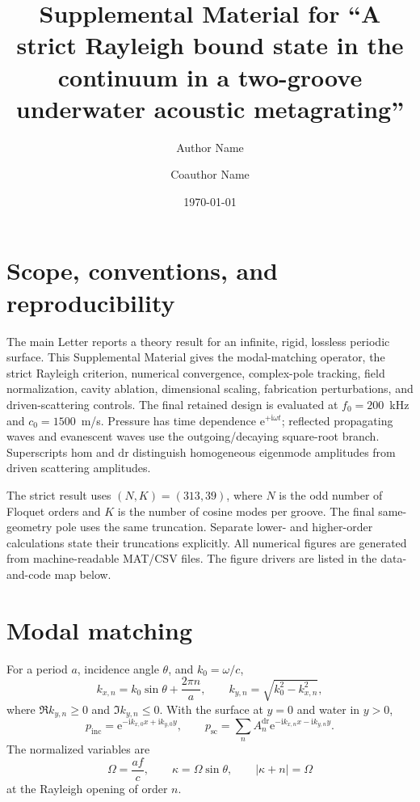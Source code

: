 \documentclass[aps,prl,reprint,superscriptaddress,nofootinbib,floatfix]{revtex4-2}
\newcommand{\ii}{\mathrm{i}}
\newcommand{\e}{\mathrm{e}}
\providecommand{\hom}{\mathrm{hom}}
\providecommand{\dr}{\mathrm{dr}}
\begin{document}
\title{Supplemental Material for ``A strict Rayleigh bound state in the continuum in a two-groove underwater acoustic metagrating''}
\author{Author Name}
\author{Coauthor Name}
\date{\today}
\maketitle

\section{Scope, conventions, and reproducibility}

The main Letter reports a theory result for an infinite, rigid, lossless
periodic surface.  This Supplemental Material gives the modal-matching
operator, the strict Rayleigh criterion, numerical convergence, complex-pole
tracking, field normalization, cavity ablation, dimensional scaling,
fabrication perturbations, and driven-scattering controls.  The final retained
design is evaluated at $f_0=200$~kHz and $c_0=1500$~m/s.  Pressure has time
dependence $\e^{+\ii\omega t}$; reflected propagating waves and evanescent
waves use the outgoing/decaying square-root branch.  Superscripts $\hom$ and
$\dr$ distinguish homogeneous eigenmode amplitudes from driven scattering
amplitudes.

The strict result uses $(N,K)=(313,39)$, where $N$ is the odd number of
Floquet orders and $K$ is the number of cosine modes per groove.  The final
same-geometry pole uses the same truncation.  Separate lower- and higher-order
calculations state their truncations explicitly.  All numerical figures are
generated from machine-readable MAT/CSV files.  The figure drivers are listed
in the data-and-code map below.

\section{Modal matching}

For a period $a$, incidence angle $\theta$, and $k_0=\omega/c$,
\begin{equation}
 k_{x,n}=k_0\sin\theta+\frac{2\pi n}{a},\qquad
 k_{y,n}=\sqrt{k_0^2-k_{x,n}^2},                                      \label{eq:s-k}
\end{equation}
where $\Re k_{y,n}\geq0$ and $\Im k_{y,n}\leq0$.  With the surface at
$y=0$ and water in $y>0$,
\begin{equation}
 p_{\mathrm{inc}}=\e^{-\ii k_{x,0}x+\ii k_{y,0}y},\qquad
 p_{\mathrm{sc}}=\sum_n A_n^{\dr}
 \e^{-\ii k_{x,n}x-\ii k_{y,n}y}.                                    \label{eq:s-exterior}
\end{equation}
The normalized variables are
\begin{equation}
 \Omega=\frac{af}{c},\qquad \kappa=\Omega\sin\theta,\qquad
 |\kappa+n|=\Omega                                                    \label{eq:s-ra}
\end{equation}
at the Rayleigh opening of order $n$.
\end{document}
